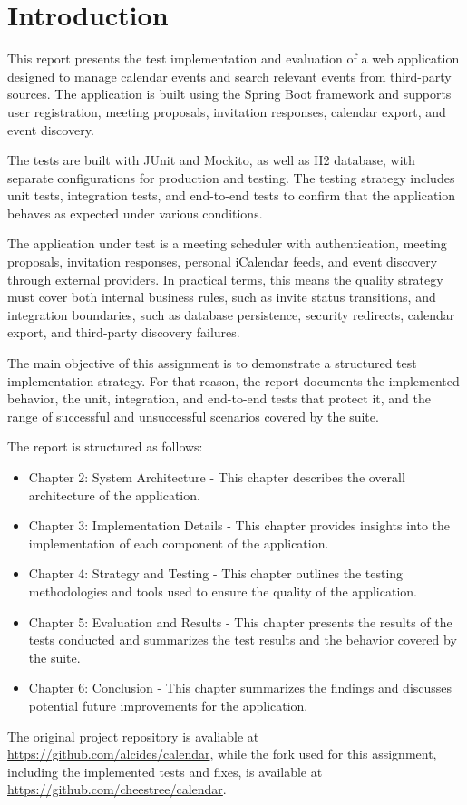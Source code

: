 \chapter{Introduction} \label{cap:intro}

This report presents the test implementation and evaluation of a web application designed to manage calendar events and search relevant events from third-party sources. The application is built using the Spring Boot framework and supports user registration, meeting proposals, invitation responses, calendar export, and event discovery.

The tests are built with JUnit and Mockito, as well as H2 database, with separate configurations for production and testing. The testing strategy includes unit tests, integration tests, and end-to-end tests to confirm that the application behaves as expected under various conditions.

The application under test is a meeting scheduler with authentication, meeting proposals, invitation responses, personal iCalendar feeds, and event discovery through external providers. In practical terms, this means the quality strategy must cover both internal business rules, such as invite status transitions, and integration boundaries, such as database persistence, security redirects, calendar export, and third-party discovery failures.

The main objective of this assignment is to demonstrate a structured test implementation strategy. For that reason, the report documents the implemented behavior, the unit, integration, and end-to-end tests that protect it, and the range of successful and unsuccessful scenarios covered by the suite.

The report is structured as follows:
\begin{itemize}
    \item Chapter 2: System Architecture - This chapter describes the overall architecture of the application.
    \item Chapter 3: Implementation Details - This chapter provides insights into the implementation of each component of the application.
    \item Chapter 4: Strategy and Testing - This chapter outlines the testing methodologies and tools used to ensure the quality of the application.
    \item Chapter 5: Evaluation and Results - This chapter presents the results of the tests conducted and summarizes the test results and the behavior covered by the suite.
    \item Chapter 6: Conclusion - This chapter summarizes the findings and discusses potential future improvements for the application.
\end{itemize}

The original project repository is avaliable at \url{https://github.com/alcides/calendar}, while the fork used for this assignment, including the implemented tests and fixes, is available at \url{https://github.com/cheestree/calendar}.
